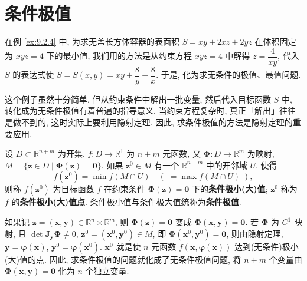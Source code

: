 \section{条件极值}

在例 \ref{ex:9.2.4} 中, 为求无盖长方体容器的表面积 $S = xy + 2xz + 2yz$ 在体积固定为 $xyz = 4$ 下的最小值, 我们用的方法是从约束方程 $xyz = 4$ 中解得 $z = \dfrac{4}{xy}$, 代入 $S$ 的表达式使 $S = S(x, y) = xy + \dfrac{8}{y} + \dfrac{8}{x}$. 于是, 化为求无条件的极值、最值问题.

这个例子虽然十分简单, 但从约束条件中解出一批变量, 然后代入目标函数 $S$ 中, 转化成为无条件极值有着普遍的指导意义. 当约束方程复杂时, 真正「解出」往往是做不到的, 这时实际上要利用隐射定理. 因此, 求条件极值的方法是隐射定理的重要应用.

\begin{definition}\label{def:9.3.1}
设 $D \subset \mathbb{R}^{n+m}$ 为开集, $f\colon D \to \mathbb{R}^{1}$ 为 $n+m$ 元函数, 又 $\boldsymbol{\Phi}\colon D \to \mathbb{R}^{m}$ 为映射, $M = \{\boldsymbol{z} \in D \mid \boldsymbol{\Phi}(\boldsymbol{z}) = \boldsymbol{0}\}$. 如果 $\boldsymbol{z}^{0} \in M$ 有一个 $\mathbb{R}^{n+m}$ 中的开邻域 $U$, 使得
\[
  f(\boldsymbol{z}^{0}) = \min f(M \cap U) \quad (\; = \max f(M \cap U) \;),
\]
则称 $f(\boldsymbol{z}^{0})$ 为目标函数 $f$ 在约束条件 $\boldsymbol{\Phi}(\boldsymbol{z}) = \boldsymbol{0}$ 下的\textbf{条件极小(大)值}; $\boldsymbol{z}^{0}$ 称为 $f$ 的\textbf{条件极小(大)值点}. 条件极小值与条件极大值统称为\textbf{条件极值}.
\end{definition}

如果记 $\boldsymbol{z} = (\boldsymbol{x}, \boldsymbol{y}) \in \mathbb{R}^{n} \times \mathbb{R}^{m}$, 则 $\boldsymbol{\Phi}(\boldsymbol{z}) = \boldsymbol{0}$ 变成 $\boldsymbol{\Phi}(\boldsymbol{x}, \boldsymbol{y}) = \boldsymbol{0}$. 若 $\boldsymbol{\Phi}$ 为 $C^{1}$ 映射, 且 $\det \boldsymbol{J}_{\boldsymbol{y}}\boldsymbol{\Phi} \neq 0$, $\boldsymbol{z}^{0} = (\boldsymbol{x}^{0}, \boldsymbol{y}^{0}) \in M$, 即 $\boldsymbol{\Phi}(\boldsymbol{x}^{0}, \boldsymbol{y}^{0}) = \boldsymbol{0}$, 则由隐射定理, $\boldsymbol{y} = \boldsymbol{\varphi}(\boldsymbol{x})$, $\boldsymbol{y}^{0} = \boldsymbol{\varphi}(\boldsymbol{x}^{0})$. $\boldsymbol{x}^{0}$ 就是使 $n$ 元函数 $f(\boldsymbol{x}, \boldsymbol{\varphi}(\boldsymbol{x}))$ 达到(无条件)极小(大)值的点. 因此, 求条件极值的问题就化成了无条件极值问题, 将 $n + m$ 个变量由 $\boldsymbol{\Phi}(\boldsymbol{x}, \boldsymbol{y}) = \boldsymbol{0}$ 化为 $n$ 个独立变量.

